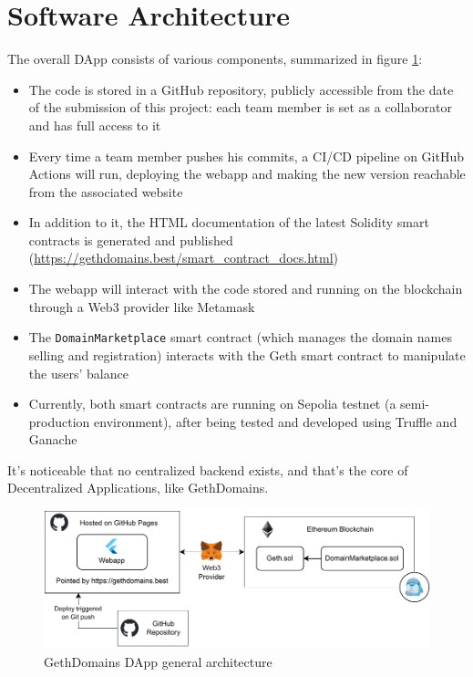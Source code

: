 \documentclass[main.tex]{subfiles}
\begin{document}
\section{Software Architecture}\label{sec:software-architecture}

The overall DApp consists of various components, summarized in figure \ref{fig:gethdomains_architecture}:
\begin{itemize}
    \item The code is stored in a GitHub repository, publicly accessible from the date of the submission of this project: each team member is set as a collaborator and has full access to it
    \item Every time a team member pushes his commits, a CI/CD pipeline on GitHub Actions will run, deploying the webapp and making the new version reachable from the associated website
    \item In addition to it, the HTML documentation of the latest Solidity smart contracts is generated and published (\href{https://gethdomains.best/smart_contract_docs.html}{https://gethdomains.best/smart\_contract\_docs.html})
    \item The webapp will interact with the code stored and running on the blockchain through a Web3 provider like Metamask
    \item The \texttt{DomainMarketplace} smart contract (which manages the domain names selling and registration) interacts with the Geth smart contract to manipulate the users' balance
    \item Currently, both smart contracts are running on Sepolia testnet (a semi-production environment), after being tested and developed using Truffle and Ganache
\end{itemize}
It's noticeable that no centralized backend exists, and that's the core of Decentralized Applications, like GethDomains.

\begin{figure}[htbp]
    \centering
    \includegraphics[width=\textwidth]{figures/gethdomains_architecture.pdf}
    \caption{GethDomains DApp general architecture}
    \label{fig:gethdomains_architecture}
\end{figure}
\newpage
\end{document}
